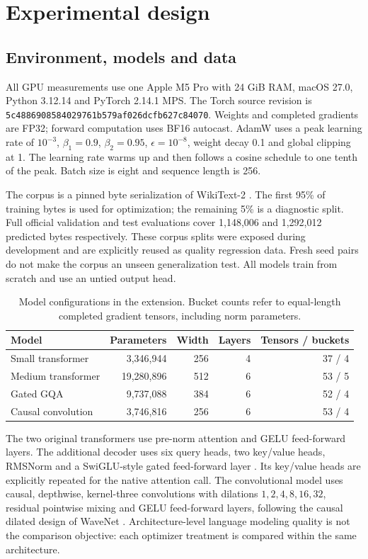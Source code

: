 \documentclass[11pt]{article}
\newcommand{\code}[1]{\texttt{#1}}
\begin{document}
\section{Experimental design}
\subsection{Environment, models and data}
All GPU measurements use one Apple M5 Pro with 24 GiB RAM, macOS 27.0,
Python 3.12.14 and PyTorch 2.14.1 MPS. The Torch source revision is
\code{5c4886908584029761b579af026dcfb627c84070}.
Weights and completed gradients are FP32; forward computation uses BF16
autocast. AdamW uses a peak learning rate of $10^{-3}$, $\beta_1=0.9$,
$\beta_2=0.95$, $\epsilon=10^{-8}$, weight decay 0.1 and global clipping at 1.
The learning rate warms up and then follows a cosine schedule to one tenth of
the peak. Batch size is eight and sequence length is 256.

The corpus is a pinned byte serialization of WikiText-2 \cite{wikitext}.
The first 95\% of training bytes is used for optimization; the remaining 5\%
is a diagnostic split. Full official validation and test evaluations cover
1,148,006 and 1,292,012 predicted bytes respectively. These corpus splits were
exposed during development and are explicitly reused as quality regression
data. Fresh seed pairs do not make the corpus an unseen generalization test.
All models train from scratch and use an untied output head.

\begin{table}[H]
\centering
\small
\begin{tabular}{lrrrr}
\toprule
Model & Parameters & Width & Layers & Tensors / buckets\\
\midrule
Small transformer & 3,346,944 & 256 & 4 & 37 / 4 \\
Medium transformer & 19,280,896 & 512 & 6 & 53 / 5 \\
Gated GQA & 9,737,088 & 384 & 6 & 52 / 4 \\
Causal convolution & 3,746,816 & 256 & 6 & 53 / 4 \\
\bottomrule
\end{tabular}
\caption{Model configurations in the extension. Bucket counts refer to
equal-length completed gradient tensors, including norm parameters.}
\label{tab:models}
\end{table}

The two original transformers use pre-norm attention and GELU feed-forward
layers. The additional decoder uses six query heads, two key/value heads,
RMSNorm and a SwiGLU-style gated feed-forward layer \cite{gqa,rms,glu}.
Its key/value heads are explicitly repeated for the native attention call.
The convolutional model uses causal, depthwise, kernel-three convolutions with
dilations $1,2,4,8,16,32$, residual pointwise mixing and GELU feed-forward layers,
following the causal dilated design of WaveNet \cite{wavenet}.
Architecture-level language modeling quality is not the comparison objective:
each optimizer treatment is compared within the same architecture.
\end{document}
